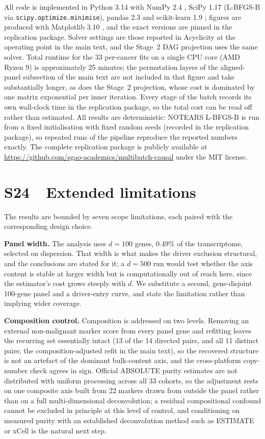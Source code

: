 \documentclass[11pt]{article}
\begin{document}
All code is implemented in Python 3.14 with NumPy 2.4 \citep{harris2020numpy}, SciPy 1.17 \citep{virtanen2020scipy} (L-BFGS-B via \texttt{scipy.optimize.minimise}), pandas 2.3 \citep{mckinney2010pandas} and scikit-learn 1.9 \citep{pedregosa2011sklearn}; figures are produced with Matplotlib 3.10 \citep{hunter2007matplotlib}, and the exact versions are pinned in the replication package. Solver settings are those reported in Acyclicity at the operating point in the main text, and the Stage~2 DAG projection uses the same solver. Total runtime for the 33 per-cancer fits on a single CPU core (AMD Ryzen 9) is approximately 25 minutes; the permutation layers of the aligned-panel subsection of the main text are not included in that figure and take substantially longer, as does the Stage~2 projection, whose cost is dominated by one matrix exponential per inner iteration. Every stage of the batch records its own wall-clock time in the replication package, so the total cost can be read off rather than estimated. All results are deterministic: NOTEARS L-BFGS-B is run from a fixed initialisation with fixed random seeds (recorded in the replication package), so repeated runs of the pipeline reproduce the reported numbers exactly. The complete replication package is publicly available at \url{https://github.com/sgao-academics/multibatch-causal} under the MIT license.

\section*{S24\ \ Extended limitations}

The results are bounded by seven scope limitations, each paired with the corresponding design choice.

\textbf{Panel width.} The analysis uses $d = 100$ genes, 0.49\% of the transcriptome, selected on dispersion. That width is what makes the driver exclusion structural, and the conclusions are stated for it; a $d = 500$ run would test whether the axis content is stable at larger width but is computationally out of reach here, since the estimator's cost grows steeply with $d$. We substitute a second, gene-disjoint 100-gene panel and a driver-entry curve, and state the limitation rather than implying wider coverage.

\textbf{Composition control.} Composition is addressed on two levels. Removing an external non-malignant marker score from every panel gene and refitting leaves the recurring set essentially intact (13 of the 14 directed pairs, and all 11 distinct pairs; the composition-adjusted refit in the main text), so the recovered structure is not an artefact of the dominant bulk-content axis, and the cross-platform copy-number check agrees in sign. Official ABSOLUTE purity estimates are not distributed with uniform processing across all 33 cohorts, so the adjustment rests on one composite axis built from 22 markers drawn from outside the panel rather than on a full multi-dimensional deconvolution; a residual compositional confound cannot be excluded in principle at this level of control, and conditioning on measured purity with an established deconvolution method such as ESTIMATE or xCell is the natural next step.
\end{document}
